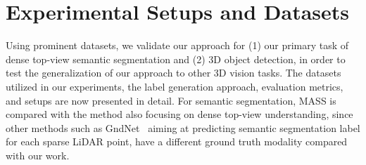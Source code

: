 \documentclass[lettersize,journal]{IEEEtran}
\begin{document}
\section{Experimental Setups and Datasets}

Using prominent datasets, we validate our approach for (1) our primary task of dense top-view semantic segmentation and (2) 3D object detection, in order to test the generalization of our approach to other 3D vision tasks.
The datasets utilized in our experiments, the label generation approach, evaluation metrics, and setups are now presented in detail. For semantic segmentation, MASS is compared with the method also focusing on dense top-view understanding, since other methods such as GndNet~\cite{gndnet} aiming at predicting semantic segmentation label for each sparse LiDAR point, have a different ground truth modality compared with our work. 
\end{document}
